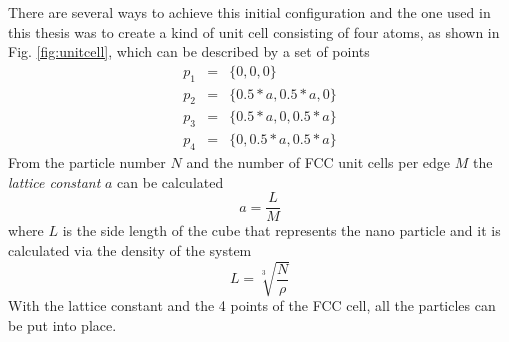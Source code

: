 \documentclass[12pt]{article}
\begin{document}
There are several ways to achieve this initial configuration and the one used in this thesis \cite{buffalo} was to create a kind of unit cell 
consisting of four atoms, as shown in Fig. \ref{fig:unitcell}, which can be described by a set of points
\begin{eqnarray*}
    p_1 &=& \{0,0,0\}\\
    p_2 &=& \{0.5*a,0.5*a,0\}\\
    p_3 &=& \{0.5*a,0,0.5*a\}\\
    p_4 &=& \{0,0.5*a,0.5*a\}
\end{eqnarray*}
From the particle number $N$ and the number of FCC unit cells per edge $M$ the \textit{lattice constant} $a$ can be calculated
\begin{equation}
    a = \frac{L}{M}
\end{equation}
where $L$ is the side length of the cube that represents the nano particle and it is calculated via the density of the system
\begin{equation}
    L = \sqrt[3]{\frac{N}{\rho}}
\end{equation}
With the lattice constant and the 4 points of the FCC cell, all the particles can be put into place.
\end{document}
